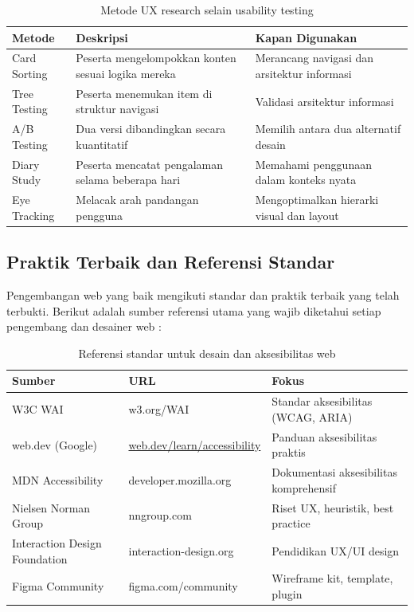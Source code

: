 \begin{table}[H]
\centering
\begin{tabular}{|P{3.5cm}|P{4cm}|P{4.5cm}|}
\hline
\textbf{Metode} & \textbf{Deskripsi} & \textbf{Kapan Digunakan} \\
\hline
Card Sorting & Peserta mengelompokkan konten sesuai logika mereka & Merancang navigasi dan arsitektur informasi \\
\hline
Tree Testing & Peserta menemukan item di struktur navigasi & Validasi arsitektur informasi \\
\hline
A/B Testing & Dua versi dibandingkan secara kuantitatif & Memilih antara dua alternatif desain \\
\hline
Diary Study & Peserta mencatat pengalaman selama beberapa hari & Memahami penggunaan dalam konteks nyata \\
\hline
Eye Tracking & Melacak arah pandangan pengguna & Mengoptimalkan hierarki visual dan layout \\
\hline
\end{tabular}
\caption{Metode UX research selain usability testing}
\end{table}

\subsection{Praktik Terbaik dan Referensi Standar}

Pengembangan web yang baik mengikuti standar dan praktik terbaik yang telah terbukti. Berikut adalah sumber referensi utama yang wajib diketahui setiap pengembang dan desainer web \cite{mdnAccessibility} \cite{webdevAccessibility} \cite{wcagW3c}:

\begin{table}[H]
\centering
\begin{tabular}{|P{3.5cm}|P{4cm}|P{4.5cm}|}
\hline
\textbf{Sumber} & \textbf{URL} & \textbf{Fokus} \\
\hline
W3C WAI & w3.org/WAI & Standar aksesibilitas (WCAG, ARIA) \\
\hline
web.dev (Google) & \url{web.dev/learn/accessibility} & Panduan aksesibilitas praktis \\
\hline
MDN Accessibility & developer.mozilla.org & Dokumentasi aksesibilitas komprehensif \\
\hline
Nielsen Norman Group & nngroup.com & Riset UX, heuristik, best practice \\
\hline
Interaction Design Foundation & interaction-design.org & Pendidikan UX/UI design \\
\hline
Figma Community & figma.com/community & Wireframe kit, template, plugin \\
\hline
\end{tabular}
\caption{Referensi standar untuk desain dan aksesibilitas web}
\end{table}

